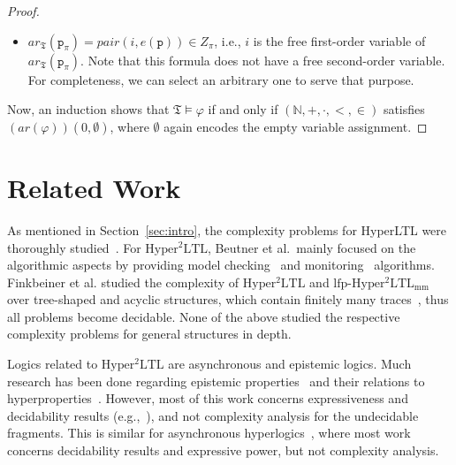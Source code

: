 \documentclass[dvipsnames,10pt,a4paper]{amsart}
\theoremstyle{definition}
\theoremstyle{remark}
\newcommand{\nats}{\mathbb{N}}
\renewcommand{\phi}{\varphi}
\newcommand{\sohyltl}{\mathrm{Hyper^2LTL}\xspace}
\newcommand{\lfpsohyltlfp}{\mathrm{lfp\text{-}{Hyper^2LTL_{\mathrm{mm}}}}\xspace}
\newcommand{\tsys}{\mathfrak{T}}
\newcommand{\proposition}{\texttt{p}}
\newcommand{\arithmetize}{{\mathit{ar}}}
\newcommand{\pair}{\mathit{pair}}
\newcommand{\natsstruct}{(\nats, +, \cdot, <, \in)}
\begin{document}
\begin{proof}
\begin{itemize}
    \item $\arithmetize_\tsys(\proposition_\pi) = \pair(i,e(\proposition)) \in Z_\pi$, i.e., $i$ is the free first-order variable of $\arithmetize_\tsys(\proposition_\pi)$. Note that this formula does not have a free second-order variable. For completeness, we can select an arbitrary one to serve that purpose.
    
\end{itemize}
Now, an induction shows that $\tsys\models \phi$ if and only if $\natsstruct$ satisfies $(\arithmetize(\phi))(0,\emptyset)$, where $\emptyset$ again encodes the empty variable assignment.
\end{proof}






\section{Related Work}
\label{sec_relatedwork}
As mentioned in Section~\ref{sec:intro}, the complexity problems for HyperLTL were thoroughly studied~\cite{FinkbeinerH16,hyperltlsatconf,hyperltlsat}. For $\sohyltl$, Beutner et al.\ mainly focused on the algorithmic aspects by providing model checking~\cite{DBLP:conf/cav/BeutnerFFM23} and monitoring~\cite{BeutnerFFM24} algorithms.
Finkbeiner et al. studied the complexity of $\sohyltl$ and $\lfpsohyltlfp$ over tree-shaped and acyclic structures, which contain finitely many traces~\cite{FoSSaCS26}, thus all problems become decidable.
None of the above studied the respective complexity problems for general structures in depth. 

Logics related to $\sohyltl$ are asynchronous and epistemic logics. Much research has been done regarding epistemic properties~\cite{DBLP:conf/clima/Dima08,DBLP:books/mit/FHMV1995,DBLP:conf/atal/LomuscioR06a,DBLP:conf/fsttcs/MeydenS99} and their relations to hyperproperties~\cite{DBLP:conf/fossacs/BozzelliMP15}. However, most of this work concerns expressiveness and decidability results (e.g.,~\cite{DBLP:journals/tocl/BozzelliMM24}), and not complexity analysis for the undecidable fragments. This is similar for asynchronous hyperlogics~\cite{BartocciHNC23,DBLP:conf/cav/BaumeisterCBFS21,BeutnerF23,DBLP:journals/corr/abs-2404-16778,DBLP:conf/lics/BozzelliPS21,DBLP:conf/concur/BozzelliPS22,DBLP:journals/pacmpl/GutsfeldMO21,DBLP:conf/mfcs/KontinenSV23,KontinenSV24,DBLP:conf/mfcs/KrebsMV018}, where most work concerns decidability results and expressive power, but not complexity analysis. 
\end{document}
